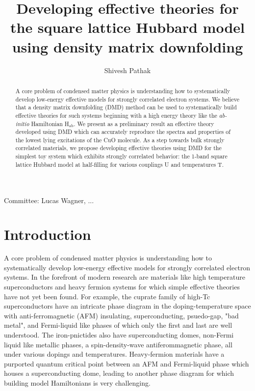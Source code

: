 \documentclass[12pt]{article}
\author{Shivesh Pathak}
\title{Developing effective theories for the square lattice Hubbard model using density matrix downfolding}
\begin{document}
\maketitle
\begin{abstract}
A core problem of condensed matter physics is understanding how to systematically develop low-energy effective models for strongly correlated electron systems. 
We believe that a density matrix downfolding (DMD) method can be used to systematically build effective theories for such systems beginning with a high energy theory like the \textit{ab-initio} Hamiltonian H$_\text{ab}$.
We present as a preliminary result an effective theory developed using DMD which can accurately reproduce the spectra and properties of the lowest lying excitations of the CuO molecule.
As a step towards bulk strongly correlated materials, we propose developing effective theories using DMD for the simplest toy system which exhibits strongly correlated behavior: the 1-band square lattice Hubbard model at half-filling for various couplings U and temperatures T.
\end{abstract}
Committee: Lucas Wagner, ...
\pagebreak

\section{Introduction}
A core problem of condensed matter physics is understanding how to systematically develop low-energy effective models for strongly correlated electron systems. 
In the forefront of modern research are materials like high temperature superconductors and heavy fermion systems for which simple effective theories have not yet been found. 
For example, the cuprate family of high-Tc superconductors have an intricate phase diagram in the doping-temperature space with anti-ferromagnetic (AFM) insulating, superconducting, psuedo-gap, "bad metal", and Fermi-liquid like phases of which only the first and last are well understood.
The iron-pnictides also have superconducting domes, non-Fermi liquid like metallic phases, a spin-density-wave antiferommagnetic phase, all under various dopings and temperatures. 
Heavy-fermion materials have a purported quantum critical point between an AFM and Fermi-liquid phase which houses a superconducting dome, leading to another phase diagram for which building model Hamiltonians is very challenging. 
\end{document}
